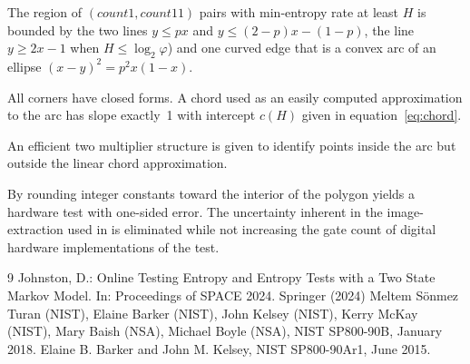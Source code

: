 \documentclass[11pt]{article}
\begin{document}
The region of $(\mathit{count1},\mathit{count11})$ pairs with min-entropy rate at
least $H$ is bounded by the two lines $y\le px$ and $y\le(2-p)x-(1-p)$,
the line $y\ge 2x-1$ when $H\le\log_2\varphi$) and one curved edge that is
a convex arc of an ellipse $(x-y)^2=p^2x(1-x)$.

All corners have closed forms. A chord used as an easily computed approximation
to the arc has slope exactly~1 with intercept $c(H)$ given in equation~\eqref{eq:chord}.

An efficient two multiplier structure is given to identify points inside the arc
but outside the linear chord approximation.

By rounding integer constants toward the interior of the polygon yields a hardware test with one-sided error. The uncertainty inherent in the image-extraction used in \cite{johnston2024} is eliminated while not increasing the gate count of digital hardware
implementations of the test.

\begin{thebibliography}{9}
Johnston, D.: Online Testing Entropy and Entropy Tests with a Two State
Markov Model. In: Proceedings of SPACE 2024. Springer (2024)
 Meltem Sönmez Turan (NIST), Elaine Barker (NIST), John Kelsey (NIST), Kerry McKay (NIST), Mary Baish (NSA), Michael Boyle (NSA), NIST SP800-90B, January 2018.
 Elaine B. Barker and John M. Kelsey, NIST SP800-90Ar1, June 2015.
\end{thebibliography}
\end{document}
